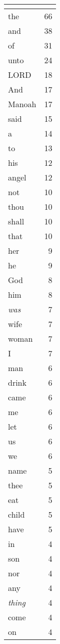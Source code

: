 \begin{center}
\begin{longtable}{l|r}
\hline \multicolumn{2}{c}{{ }} \\ \hline
\endfoot 
the & 66\\ \hline 
and & 38\\ \hline 
of & 31\\ \hline 
unto & 24\\ \hline 
LORD & 18\\ \hline 
And & 17\\ \hline 
Manoah & 17\\ \hline 
said & 15\\ \hline 
a & 14\\ \hline 
to & 13\\ \hline 
his & 12\\ \hline 
angel & 12\\ \hline 
not & 10\\ \hline 
thou & 10\\ \hline 
shall & 10\\ \hline 
that & 10\\ \hline 
her & 9\\ \hline 
he & 9\\ \hline 
God & 8\\ \hline 
him & 8\\ \hline 
\emph{was} & 7\\ \hline 
wife & 7\\ \hline 
woman & 7\\ \hline 
I & 7\\ \hline 
man & 6\\ \hline 
drink & 6\\ \hline 
came & 6\\ \hline 
me & 6\\ \hline 
let & 6\\ \hline 
us & 6\\ \hline 
we & 6\\ \hline 
name & 5\\ \hline 
thee & 5\\ \hline 
eat & 5\\ \hline 
child & 5\\ \hline 
have & 5\\ \hline 
in & 4\\ \hline 
son & 4\\ \hline 
nor & 4\\ \hline 
any & 4\\ \hline 
\emph{thing} & 4\\ \hline 
come & 4\\ \hline 
on & 4\\ \hline 

\end{longtable}
\end{center}
